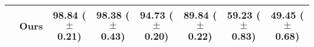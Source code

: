\begin{table}[t]
{\begin{tabular}{l l c c c c c c}
     & Ours & {\bf 98.84} {\scriptsize ($\pm$ 0.21)} & {\bf 98.38} {\scriptsize ($\pm$ 0.43)} & {\bf 94.73} {\scriptsize ($\pm$ 0.20)} & {\bf 89.84} {\scriptsize ($\pm$ 0.22)} & {\bf 59.23}  {\scriptsize ($\pm$ 0.83)} & {\bf 49.45}  {\scriptsize ($\pm$ 0.68)} \\
    \bottomrule
\end{tabular}
}
\vspace{-3mm}
\label{tab:results_applying_scheduling_to_recent_replay_methods}
\end{table}

\begin{comment}

\begin{table*}[t]
\footnotesize
\centering
\caption{
    Performance comparison between scheduling methods RS-MCTS (Ours), Random, ETS, and Heuristic when combining them with replay-based methods HAL, MER, DER, and DER++. %
    Replay memory sizes are $M=10$ and $M=100$ for the 5-task and 10/20-task datasets respectively. We report the mean and standard deviation averaged over 5 seeds. Results on Heuristic where some seed did not converge is denoted by $^{*}$. Applying RS-MCTS to each method can enhance the performance compared to using the baseline schedules. 
}
\scalebox{0.87}{
\begin{tabular}{l l c c c c c c}
    \toprule
     & & \multicolumn{3}{c}{{\bf 5-task Datasets}} & \multicolumn{3}{c}{{\bf 10- and 20-task Datasets}} \\
    \cmidrule(lr){3-5} \cmidrule(lr){6-8}
    {\bf Method} & {\bf Schedule}  & S-MNIST & S-FashionMNIST & S-notMNIST & P-MNIST & S-CIFAR-100 & S-miniImagenet \\
    \midrule
    \multirow{4}{*}{HAL} & Random & 97.24 {\scriptsize ($\pm$ 0.70)}  & 86.74 {\scriptsize ($\pm$ 6.05)} & 93.61 {\scriptsize($\pm$ 1.31)}  & 88.49 {\scriptsize ($\pm$ 0.99)}  & 36.09 {\scriptsize ($\pm$ 1.77)} & 38.51 {\scriptsize ($\pm$ 2.22)} \\
     & ETS  & 94.02 {\scriptsize ($\pm$ 4.25)} &  95.81 {\scriptsize ($\pm$ 3.53)} & 91.01 {\scriptsize ($\pm$ 1.39)} & 88.46 {\scriptsize ($\pm$ 0.86)}  & 34.90 {\scriptsize ($\pm$ 2.02)} & 38.13 {\scriptsize ($\pm$ 1.18)} \\
    & Heuristic & 97.69 {\scriptsize ($\pm$ 0.19)} & $^{*}$74.16 {\scriptsize ($\pm$ 11.19)} & 93.64 {\scriptsize ($\pm$ 0.93)} & $^{*}$66.63 {\scriptsize ($\pm$ 28.50)} & 35.07 {\scriptsize($\pm$ 1.29)} & 39.51 {\scriptsize($\pm$ 1.49)} \\

\end{comment}
